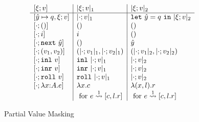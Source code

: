 %

\begin{figure}
\[\begin{array}{l|l|l}
[\xi;v] & \masko{\xi;v} & \maskt{\xi;v} \\ \hline
[\hat y \mapsto q,\xi;v]
  & \masko{\cdot;v}
  & \letin {\hat y} q {\maskt{\xi;v}} \\\relax
[\cdot;()] 
  & ()
  & () \\\relax
[\cdot;i] 
  & i
  & () \\\relax
[\cdot;\next~\hat y] 
  & ()
  & \hat y \\\relax
[\cdot;(v_1,v_2)] 
  & (\masko {\cdot;v_1},\masko {\cdot;v_2})
  & (\maskt {\cdot;v_1},\maskt {\cdot;v_2}) \\\relax
[\cdot;\inl~v] 
  & \inl~\masko{\cdot;v}
  & \maskt {\cdot;v} \\\relax
[\cdot;\inr~v] 
  & \inr~\masko{\cdot;v}
  & \maskt {\cdot;v} \\\relax
[\cdot;\roll~v] 
  & \roll~\masko{\cdot;v}
  & \maskt {\cdot;v} \\\relax
[\cdot;\lam xAe]
  & \lambda x.c 
  & \lambda (x,l).r \\
& \text{ for } \splitone e A {c,l.r}
& \text{ for } \splitone e A {c,l.r}
\end{array}\]

\caption{Partial Value Masking}
\label{fig:valMask}
\end{figure}

